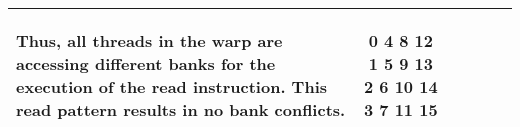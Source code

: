 \documentclass[a4paper,9pt]{article}
\begin{document}
\begin{table}[H]
{\begin{tabular}{p{4.8em}cccp{10em}c}
\begin{spacing}{0.6}
{                                              Thus, all threads in the warp are accessing different banks for the execution of the read instruction.
                                              This read pattern results in no bank conflicts.}
                                            \vspace*{-\baselineskip}
                                            \end{spacing}
                                            \vspace*{-\baselineskip}
                                          & \multicolumn{1}{p{5em}}{0    4    8   12    1    5    9   13    2    6   10   14    3    7   11   15}\\
      \bottomrule
    \end{tabular}
  }
  \end{table}
\end{document}

